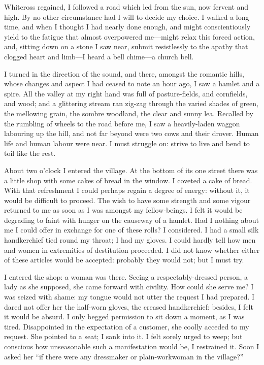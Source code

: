 Whitcross regained, I followed a road which led from the sun, now
fervent and high. By no other circumstance had I will to decide my
choice. I walked a long time, and when I thought I had nearly done
enough, and might conscientiously yield to the fatigue that almost
overpowered me---might relax this forced action, and, sitting down on a
stone I saw near, submit resistlessly to the apathy that clogged heart
and limb---I heard a bell chime---a church bell.

I turned in the direction of the sound, and there, amongst the romantic
hills, whose changes and aspect I had ceased to note an hour ago, I saw
a hamlet and a spire. All the valley at my right hand was full of
pasture-fields, and cornfields, and wood; and a glittering stream ran
zig-zag through the varied shades of green, the mellowing grain, the
sombre woodland, the clear and sunny lea. Recalled by the rumbling of
wheels to the road before me, I saw a heavily-laden waggon labouring up
the hill, and not far beyond were two cows and their drover. Human life
and human labour were near. I must struggle on: strive to live and bend
to toil like the rest.

About two o'clock \PM{} I entered the village. At the bottom of its one
street there was a little shop with some cakes of bread in the window.
I coveted a cake of bread. With that refreshment I could perhaps regain
a degree of energy: without it, it would be difficult to proceed. The
wish to have some strength and some vigour returned to me as soon as I
was amongst my fellow-beings. I felt it would be degrading to faint
with hunger on the causeway of a hamlet. Had I nothing about me I could
offer in exchange for one of these rolls? I considered. I had a small
silk handkerchief tied round my throat; I had my gloves. I could hardly
tell how men and women in extremities of destitution proceeded. I did
not know whether either of these articles would be accepted: probably
they would not; but I must try.

I entered the shop: a woman was there. Seeing a respectably-dressed
person, a lady as she supposed, she came forward with civility. How
could she serve me? I was seized with shame: my tongue would not utter
the request I had prepared. I dared not offer her the half-worn gloves,
the creased handkerchief: besides, I felt it would be absurd. I only
begged permission to sit down a moment, as I was tired. Disappointed in
the expectation of a customer, she coolly acceded to my request. She
pointed to a seat; I sank into it. I felt sorely urged to weep; but
conscious how unseasonable such a manifestation would be, I restrained
it. Soon I asked her \enquote{if there were any dressmaker or
	plain-workwoman in the village?}

